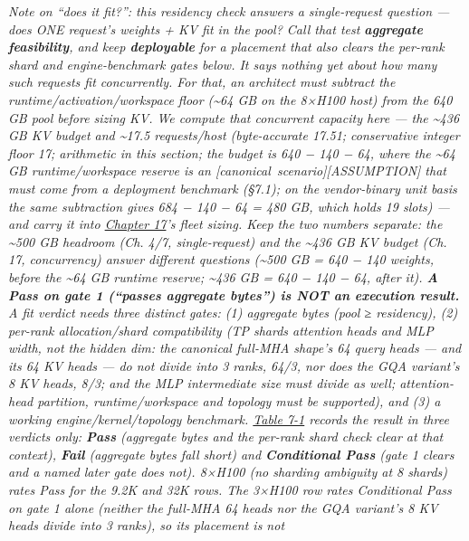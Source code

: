 \emph{Note on ``does it fit?'': this residency check answers a
single-request question --- does ONE request's weights + KV fit in the
pool? Call that test \textbf{aggregate feasibility}, and keep
\textbf{deployable} for a placement that also clears the per-rank shard
and engine-benchmark gates below. It says nothing yet about how many
such requests fit concurrently. For that, an architect must subtract the
runtime/activation/workspace floor (\textasciitilde64 GB on the 8×H100
host) from the 640 GB pool before sizing KV. We compute that concurrent
capacity here --- the \textasciitilde436 GB KV budget and
\textasciitilde17.5 requests/host (byte-accurate 17.51; conservative
integer floor 17; arithmetic in this section; the budget is 640 − 140 −
64, where the \textasciitilde64 GB runtime/workspace reserve is an
\mbox{{[}canonical scenario{]}}\hspace{0pt}\mbox{{[}ASSUMPTION{]}} that must come from a
deployment benchmark (§7.1); on the vendor-binary unit basis the same
subtraction gives 684 − 140 − 64 = 480 GB, which holds 19 slots) --- and
carry it into \hyperref[chap:17]{Chapter 17}'s fleet sizing. Keep the two numbers separate:
the \textasciitilde500 GB headroom (Ch. 4/7, single-request) and the
\textasciitilde436 GB KV budget (Ch. 17, concurrency) answer different
questions (\textasciitilde500 GB = 640 − 140 weights, before the
\textasciitilde64 GB runtime reserve; \textasciitilde436 GB = 640 − 140
− 64, after it). \textbf{A Pass on gate 1 (``passes aggregate bytes'')
is NOT an execution result.} A fit verdict needs three distinct gates:
(1) aggregate bytes (pool ≥ residency), (2) per-rank allocation/shard
compatibility (TP shards attention heads and MLP width, not the hidden
dim: the canonical full-MHA shape's 64 query heads --- and its 64 KV
heads --- do not divide into 3 ranks, 64/3, nor does the GQA variant's 8
KV heads, 8/3; and the MLP intermediate size must divide as well;
attention-head partition, runtime/workspace and topology must be
supported), and (3) a working engine/kernel/topology benchmark. \hyperref[tab:7.1]{Table 7-1} records the result in three verdicts only: \textbf{Pass} (aggregate
bytes and the per-rank shard check clear at that context), \textbf{Fail}
(aggregate bytes fall short) and \textbf{Conditional Pass} (gate 1
clears and a named later gate does not). 8×H100 (no sharding ambiguity
at 8 shards) rates Pass for the 9.2K and 32K rows. The 3×H100 row rates
Conditional Pass on gate 1 alone (neither the full-MHA 64 heads nor the
GQA variant's 8 KV heads divide into 3 ranks), so its placement is not
}
